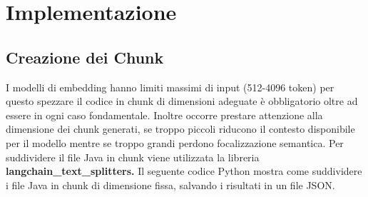 \documentclass[12pt,a4paper,openright,twoside]{book}
\begin{document}
\section{Implementazione}
\subsection{Creazione dei Chunk}
I modelli di embedding hanno limiti massimi di input (512-4096 token)  per questo spezzare il codice in chunk di dimensioni adeguate è obbligatorio oltre ad essere in ogni caso fondamentale.
Inoltre occorre prestare attenzione alla dimensione dei chunk generati, se troppo piccoli riducono il contesto disponibile per il modello mentre se troppo grandi perdono focalizzazione semantica.
Per suddividere il file Java in chunk viene utilizzata la libreria \textbf{langchain\_text\_splitters.}
Il seguente codice Python mostra come suddividere i file Java in chunk di dimensione fissa, salvando i risultati in un file JSON.
\end{document}

